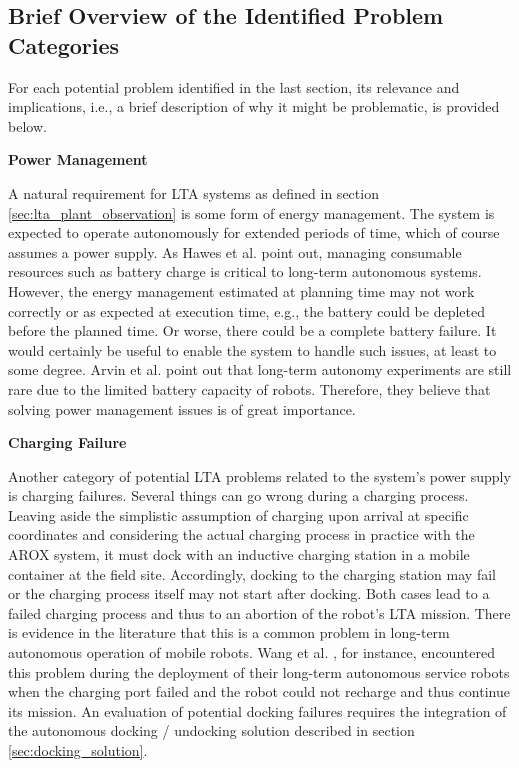 \documentclass[english, master, utf8]{base/thesis_KBS}
\begin{document}
\subsection{Brief Overview of the Identified Problem Categories}
\label{sec:brief_overview_challenges}

For each potential problem identified in the last section, its relevance and implications, i.e., a brief description of why it might be problematic, is provided below.\newline

\noindent
\textbf{Power Management}\newline

\noindent
A natural requirement for LTA systems as defined in section \ref{sec:lta_plant_observation} is some form of energy management.
The system is expected to operate autonomously for extended periods of time, which of course assumes a power supply. 
As Hawes et al. \cite{Hawes:2017} point out, managing consumable resources such as battery charge is critical to long-term autonomous systems.
However, the energy management estimated at planning time may not work correctly or as expected at execution time, e.g., the battery could be 
depleted before the planned time. Or worse, there could be a complete battery failure. It would certainly be useful to enable the system to handle such issues, at least to 
some degree. Arvin et al. point out that long-term autonomy experiments are still rare due to the limited battery capacity of robots. \cite{Arvin:2018}
Therefore, they believe that solving power management issues is of great importance.\newline

\noindent
\textbf{Charging Failure}\newline

\noindent
Another category of potential LTA problems related to the system's power supply is charging failures. Several things can go wrong during a charging process. 
Leaving aside the simplistic assumption of charging upon arrival at specific coordinates and considering the actual charging process 
in practice with the AROX system, it must dock with an inductive charging station in a mobile container at the field site.
Accordingly, docking to the charging station may fail or the charging process itself may not start after docking.
Both cases lead to a failed charging process and thus to an abortion of the robot's LTA mission.
There is evidence in the literature that this is a common problem in long-term autonomous operation of mobile robots. Wang et al. \cite{Wang:2018}, for instance, encountered
this problem during the deployment of their long-term autonomous service robots when the charging port failed and the robot could not recharge and thus continue its mission.
An evaluation of potential docking failures requires the integration of the autonomous docking / undocking solution described in section \ref{sec:docking_solution}.\newline
\end{document}
